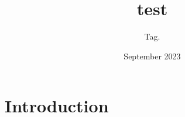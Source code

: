 \documentclass{article}
\title{test}
\author{Tag. }
\date{September 2023}
\begin{document}
\maketitle

\section{Introduction}
\end{document}
